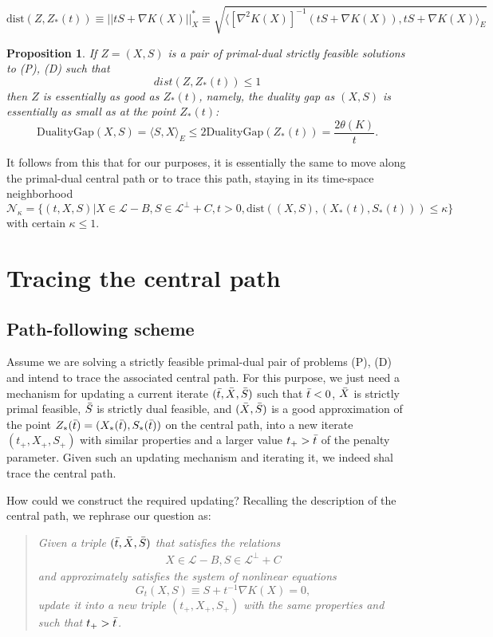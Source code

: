 \documentclass[11pt,a4paper]{article}
\newtheorem{prop}[thm]{Proposition}
\begin{document}
\[\text{dist}(Z,Z_*(t)) \equiv ||tS+\nabla K(X)||^*_X \equiv \sqrt{\langle[\nabla^2 K(X)]^{-1}(tS+\nabla K(X)), tS+\nabla K(X) \rangle_E}\]

\begin{prop}
    If $Z=(X,S)$ is a pair of primal-dual strictly feasible solutions to (P), (D) such that
    \[dist(Z, Z_*(t)) \leq 1\]
    then $Z$ is essentially as good as $Z_*(t)$, namely, the duality gap as $(X,S)$ is essentially as small as at the point $Z_*(t)$:
    \[\text{DualityGap}(X,S) = \langle S,X\rangle_E \leq 2\text{DualityGap}(Z_*(t)) = \frac{2\theta(K)}{t}.\]
\end{prop}

It follows from this that for our purposes, it is essentially the same to move along the primal-dual central path or to trace this path, staying in its time-space neighborhood
\[\mathcal{N}_\kappa = \{(t,X,S) | X \in \mathcal{L}-B, S\in \mathcal{L}^\perp+C, t>0, \text{dist}((X,S),(X_*(t),S_*(t)))\leq \kappa\}\]
with certain $\kappa \leq 1$.

\section{Tracing the central path}

\subsection{Path-following scheme}

Assume we are solving a strictly feasible primal-dual pair of problems (P), (D) and intend to trace the associated central path. For this purpose, we just need a mechanism for updating a current iterate $(\Bar{t}, \Bar{X}, \Bar{S})$ such that $\Bar{t}<0$, $\Bar{X}$ is strictly primal feasible, $\Bar{S}$ is strictly dual feasible, and $(\Bar{X}, \Bar{S})$ is a good approximation of the point $Z_*(\Bar{t}) = (X_*(\Bar{t}), S_*(\Bar{t}))$ on the central path, into a new iterate $(t_+, X_+, S_+)$ with similar properties and a larger value $t_+ > \Bar{t}$ of the penalty parameter. Given such an updating mechanism and iterating it, we indeed shal trace the central path.

How could we construct the required updating? Recalling the description of the central path, we rephrase our question as:

\begin{quote}
\textit{Given a triple $(\Bar{t}, \Bar{X}, \Bar{S})$ that satisfies the relations
\begin{align}\label{sys:4}
    X \in \mathcal{L}-B,
    S \in \mathcal{L}^\perp+C
\end{align}
and approximately satisfies the system of nonlinear equations
\begin{equation} \label{eq:5}
    G_t(X,S) \equiv S+t^{-1}\nabla K(X) = 0,
\end{equation}
update it into a new triple $(t_+, X_+, S_+)$ with the same properties and such that $t_+>\Bar{t}$.
}
\end{quote}
\end{document}
